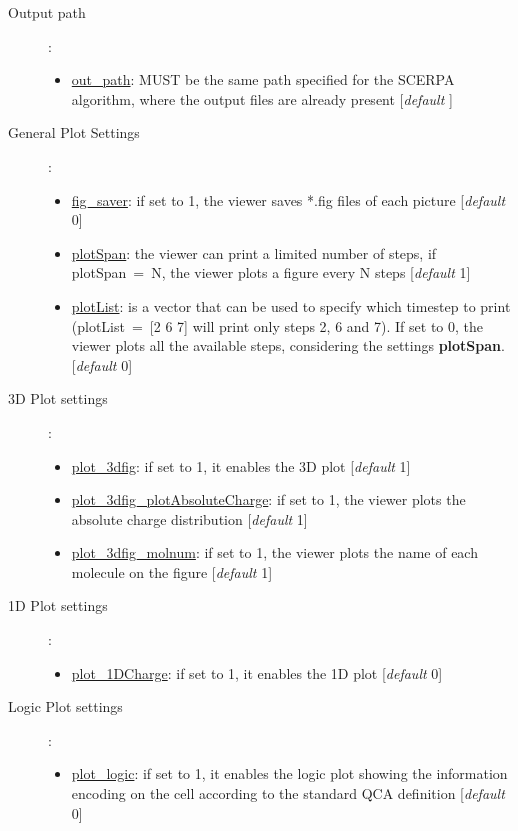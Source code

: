 \documentclass[a4paper,10pt]{article}
\begin{document}
\begin{description}

\item[Output path]:
\begin{itemize}
	\item \underline{out\_path}: MUST be the same path specified for the SCERPA algorithm, where the output files are already present [\textit{default} \textcolor{mylilas}{\textquotesingle}] 
\end{itemize}

\item[General Plot Settings]:
\begin{itemize}
	\item \underline{fig\_saver}: if set to 1, the viewer saves *.fig files of each picture [\textit{default} 0]
	\item \underline{plotSpan}: the viewer can print a limited number of steps, if plotSpan~=~N, the viewer plots a figure every N steps [\textit{default} 1]
	\item \underline{plotList}: is a vector that can be used to specify which timestep to print (plotList~=~[2 6 7] will print only steps 2, 6 and 7). If set to 0, the viewer plots all the available steps, considering the settings \textbf{plotSpan}. [\textit{default} 0]
\end{itemize}

\item[3D Plot settings]:
\begin{itemize}
	\item \underline{plot\_3dfig}: if set to 1, it enables the 3D plot [\textit{default} 1]
	\item \underline{plot\_3dfig\_plotAbsoluteCharge}: if set to 1, the viewer plots the absolute charge distribution [\textit{default} 1]
	\item \underline{plot\_3dfig\_molnum}: if set to 1, the viewer plots the name of each molecule on the figure [\textit{default} 1]
\end{itemize}

\item[1D Plot settings]:
\begin{itemize}
	\item \underline{plot\_1DCharge}: if set to 1, it enables the 1D plot [\textit{default} 0]
\end{itemize}

\item[Logic Plot settings]:
\begin{itemize}
	\item \underline{plot\_logic}: if set to 1, it enables the logic plot showing the information encoding on the cell according to the standard QCA definition [\textit{default} 0]
\end{itemize}


\end{description}
\end{document}
